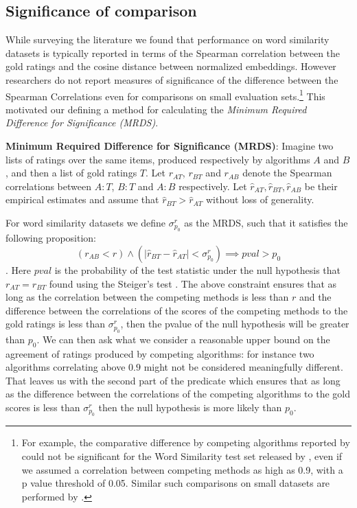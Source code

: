 \documentclass[11pt]{article}
\begin{document}
\subsection{Significance of comparison} \label{ssec:mrds}
While surveying the literature we found that performance on word
similarity datasets is typically reported in terms of the Spearman
correlation between the gold ratings and the cosine distance between
normalized embeddings.  However researchers do not report measures of
significance of the difference between the Spearman Correlations even
for comparisons on small evaluation sets.\footnote{For example, the
  comparative difference by competing algorithms reported by
   could not be significant for the
  Word Similarity test set released by
  , even if we assumed a correlation
  between competing methods as high as 0.9, with a p value threshold of
  0.05.  Similar such comparisons on small datasets are
  performed by .} This motivated our defining a
method for calculating the \emph{Minimum Required Difference for
  Significance (MRDS)}.

\noindent\textbf{Minimum Required Difference for Significance (MRDS)}:
Imagine two lists of ratings over the same items, produced
respectively by algorithms $A$ and $B$, and then a list of gold
ratings $T$. Let $r_{AT}$, $r_{BT}$ and $r_{AB}$ denote the Spearman
correlations between $A:T$, $B:T$ and $A:B$ respectively. Let
$\hat{r}_{AT}, \hat{r}_{BT}, \hat{r}_{AB}$ be their empirical
estimates and assume that $\hat{r}_{BT} > \hat{r}_{AT}$ without loss
of generality.

For word similarity datasets we define $\sigma_{p_0}^r$ as the MRDS,
such that it satisfies the following proposition: {\small $$ (r_{AB} <
  r) \land (|\hat{r}_{BT} - \hat{r}_{AT}|{<}\sigma_{p_0}^r) {\implies}
  \textit{pval} > p_0$$}. Here $\textit{pval}$ is the probability of
the test statistic under the null hypothesis that $r_{AT} = r_{BT}$
found using the Steiger's test \cite{steiger1980tests}. The above
constraint ensures that as long as the correlation between the
competing methods is less than $r$ and the difference between the
correlations of the scores of the competing methods to the gold
ratings is less than $\sigma_{p_0}^r$, then the pvalue of the null
hypothesis will be greater than $p_0$.  We can then ask what we
consider a reasonable upper bound on the agreement of ratings produced
by competing algorithms: for instance two algorithms correlating above
$0.9$ might not be considered meaningfully different.  That leaves us
with the second part of the predicate which ensures that as long as
the difference between the correlations of the competing algorithms to
the gold scores is less than $\sigma_{p_0}^r$ then the null hypothesis
is more likely than $p_0$.
\end{document}
